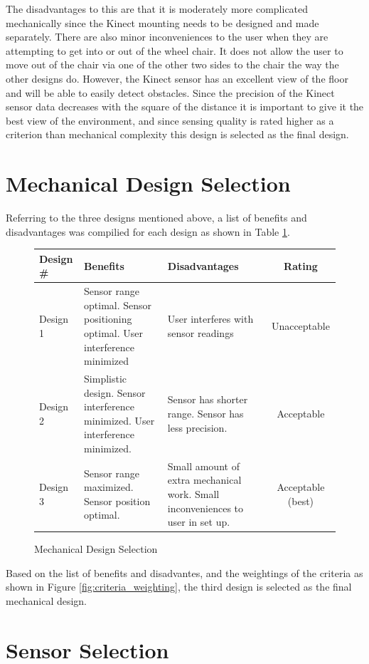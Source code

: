 \documentclass[oneside,final,a4paper]{report}
\begin{document}
The disadvantages to this are that it is moderately more complicated mechanically since the Kinect mounting needs to be designed and made separately. There are also minor inconveniences to the user when they are attempting to get into or out of the wheel chair. It does not allow the user to move out of the chair via one of the other two sides to the chair the way the other designs do. However, the Kinect sensor has an excellent view of the floor and will be able to easily detect obstacles. Since the precision of the Kinect sensor data decreases with the square of the distance it is important to give it the best view of the environment, and since sensing quality is rated higher as a criterion than mechanical complexity this design is selected as the final design.


\section{Mechanical Design Selection} \label{MechDesSel}
Referring to the three designs mentioned above, a list of benefits and disadvantages was compilied for each design as shown in Table \ref{tab:MechDesSel}.

\begin{figure}[ht]
\centering
\begin{tabular}{|l|p{5cm}|p{5cm}|c|}
\hline
Design \# & Benefits & Disadvantages & Rating\\
\hline \hline
Design 1 &Sensor range optimal. Sensor positioning optimal. User interference minimized & User interferes with sensor readings& Unacceptable\\
\hline
Design 2 & Simplistic design. Sensor interference minimized. User interference minimized. & Sensor has shorter range. Sensor has less precision. & Acceptable\\
\hline
Design 3 & Sensor range maximized. Sensor position optimal.&Small amount of extra mechanical work. Small inconveniences to user in set up. & Acceptable (best)\\
\hline
\end{tabular}
\caption{Mechanical Design Selection}
\label{tab:MechDesSel}
\end{figure}

Based on the list of benefits and disadvantes, and the weightings of the criteria as shown in Figure \ref{fig:criteria_weighting}, the third design is selected as the final mechanical design.

\section{Sensor Selection}
\end{document}
